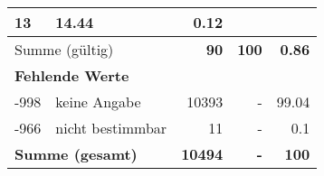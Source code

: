 \begin{longtable}{lXrrr}
       \num{13} &
       \num[round-mode=places,round-precision=2]{14,44} &
         \num[round-mode=places,round-precision=2]{0,12} \\
     \midrule
     \multicolumn{2}{l}{Summe (gültig)} &
       \textbf{\num{90}} &
     \textbf{100} &
       \textbf{\num[round-mode=places,round-precision=2]{0,86}} \\
     \multicolumn{5}{l}{\textbf{Fehlende Werte}}\\
       -998 &
       keine Angabe &
         \num{10393} &
        - &
         \num[round-mode=places,round-precision=2]{99,04} \\
       -966 &
       nicht bestimmbar &
         \num{11} &
        - &
         \num[round-mode=places,round-precision=2]{0,1} \\
     \midrule
     \multicolumn{2}{l}{\textbf{Summe (gesamt)}} &
          \textbf{\num{10494}} &
        \textbf{-} &
        \textbf{100} \\
     \bottomrule
     \end{longtable}
     
